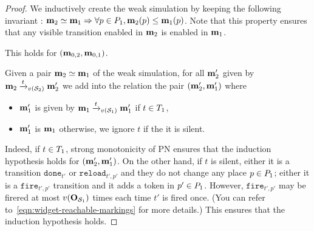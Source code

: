 \begin{proof}
  We inductively create the weak simulation by keeping the following invariant :
  \( \mathbf{m}_2 \simeq \mathbf{m}_1 \Rightarrow \forall p \in P_1, \mathbf{m}_2(p) \leq \mathbf{m}_1(p) \).
  Note that this property ensures that any visible transition enabled in $\mathbf{m}_2$ is enabled in $\mathbf{m}_1$.
  
  This holds for $(\mathbf{m}_{0,2}, \mathbf{m}_{0,1})$.

  Given a pair $\mathbf{m}_2 \simeq \mathbf{m}_1$ of the weak simulation, for all $\mathbf{m}'_2$ given by
  $\mar_2 \fire[{\val(\namePPN[2])}]{t} \mar'_2$
  we add into the relation the pair $(\mathbf{m}'_2, \mathbf{m}'_1)$ where
  \begin{itemize}
    \item $\mathbf{m}'_1$ is given by $\mar_1 \fire[{\val(\namePPN[1])}]{t} \mar'_1$ if $t \in T_1$,
    \item $\mathbf{m}'_1$ is $\mathbf{m}_1$ otherwise, \ie we ignore $t$ if the it is silent.
  \end{itemize}

  Indeed, if $t \in T_1$, strong monotonicity of \ac{PN} ensures that the induction hypothesis holds for $(\mathbf{m}'_2, \mathbf{m}'_1)$.
  On the other hand, if $t$ is silent, either it is a transition $\mathtt{done}_{t'}$ or $\mathtt{reload}_{t',p'}$ and they do not change any place $p \in P_1$; either it is a $\mathtt{fire}_{t',p'}$ transition and it adds a token in $p' \in P_1$.
  However, $\mathtt{fire}_{t',p'}$ may be firered at most $\val[{\outm[{\namePPN[1]}]}]$ times each time $t'$ is fired once.
  (You can refer to~\cref{eqn:widget-reachable-markings} for more details.)
  This ensures that the induction hypothesis holds.
\end{proof}

